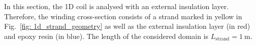 In this section, the 1D coil is analysed with an external insulation layer. Therefore, the winding cross-section consists of a strand marked in yellow in Fig.~\ref{fig: 1d_strand_geometry} as well as the external insulation layer (in red) and epoxy resin (in blue). The length of the considered domain is $L_\text{strand}=1~\text{m}$.
